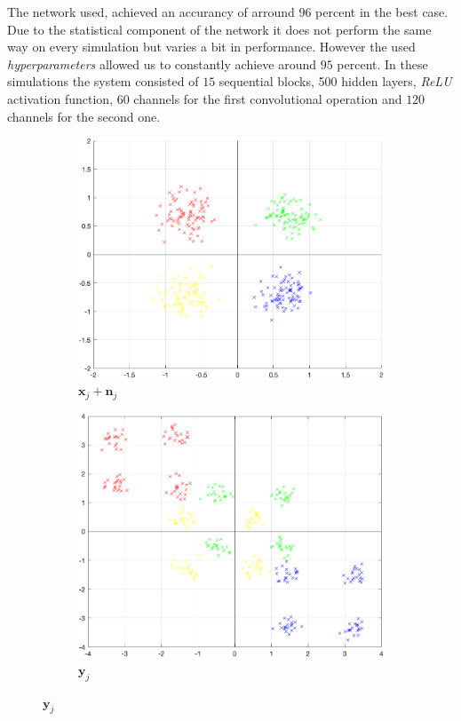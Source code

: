 \documentclass[oneside]{msvreport}%
\newcommand{\B}[1]{\boldsymbol{#1}}
\newcommand{\e}[1]{\emph{#1}}
\begin{document}
\noindent The network used, achieved an accurancy of arround $96$ percent in the best case. Due to the statistical component of the network it does not perform the same way on every simulation but varies a bit in performance. However the used \emph{hyperparameters} allowed us to constantly achieve around $95$ percent. In these simulations the system consisted of $15$ sequential blocks, 500 hidden layers, \e{ReLU} activation function, $60$ channels for the first convolutional operation and $120$ channels for the second one.\\

\begin{figure}
\begin{subfigure}{.5\textwidth}
  \centering
  \includegraphics[width=.8\linewidth]{xplusn.png}  
  \caption{$\B{x}_j + \B{n}_j$}
  \label{fig:sub-first}
\end{subfigure}
\begin{subfigure}{.5\textwidth}
  \centering
  \includegraphics[width=.8\linewidth]{y.png}  
  \caption{$\B{y}_j$}
  \label{fig:sub-second}
\end{subfigure}


\end{figure}
\end{document}
